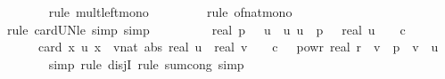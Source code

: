\begin{isabellebody}
\ \ \ \ \ \ \isamarkupfalse%
\ {\isacharparenleft}{\kern0pt}rule\ mult{\isacharunderscore}{\kern0pt}left{\isacharunderscore}{\kern0pt}mono{\isacharparenright}{\kern0pt}\isanewline
\ \ \ \ \ \ \ \isamarkupfalse%
\ {\isacharparenleft}{\kern0pt}rule\ of{\isacharunderscore}{\kern0pt}nat{\isacharunderscore}{\kern0pt}mono{\isacharparenright}{\kern0pt}\isanewline
\ \ \ \ \ \ \isamarkupfalse%
\ {\isacharparenleft}{\kern0pt}rule\ card{\isacharunderscore}{\kern0pt}UN{\isacharunderscore}{\kern0pt}le{\isacharcomma}{\kern0pt}\ simp{\isacharcomma}{\kern0pt}\ simp{\isacharparenright}{\kern0pt}\isanewline
\ \ \ \ \isamarkupfalse%
\ \isamarkupfalse%
\ {\isachardoublequoteopen}{\isachardot}{\kern0pt}{\isachardot}{\kern0pt}{\isachardot}{\kern0pt}\ {\isacharequal}{\kern0pt}\ {}{\isacharslash}{\kern0pt}{\isacharparenleft}{\kern0pt}real\ p{\isacharparenright}{\kern0pt}\ {\isacharasterisk}{\kern0pt}\ {\isacharparenleft}{\kern0pt}{\isasymSum}\ u{\isacharprime}{\kern0pt}\ {\isasymin}\ {\isacharbraceleft}{\kern0pt}u{\isachardot}{\kern0pt}\ u\ {\isacharless}{\kern0pt}\ p\ {\isasymand}\ \ real\ u\ {\isasymle}\ {}\ {\isacharasterisk}{\kern0pt}\ c{\isacharbraceright}{\kern0pt}{\isachardot}{\kern0pt}\isanewline
\ \ \ \ \ \ card\ {\isacharparenleft}{\kern0pt}{\isacharparenleft}{\kern0pt}{\isasymlambda}x{\isachardot}{\kern0pt}\ {\isacharparenleft}{\kern0pt}u{\isacharprime}{\kern0pt}\ {\isacharcomma}{\kern0pt}x{\isacharparenright}{\kern0pt}{\isacharparenright}{\kern0pt}\ {\isacharbackquote}{\kern0pt}\ {\isacharbraceleft}{\kern0pt}{\isacharparenleft}{\kern0pt}v{\isacharcolon}{\kern0pt}{\isacharcolon}{\kern0pt}nat{\isacharparenright}{\kern0pt}{\isachardot}{\kern0pt}\ abs\ {\isacharparenleft}{\kern0pt}real\ u{\isacharprime}{\kern0pt}\ {\isacharminus}{\kern0pt}\ real\ v{\isacharparenright}{\kern0pt}\ {\isasymle}\ {}\ {\isacharasterisk}{\kern0pt}\ c\ {\isacharasterisk}{\kern0pt}\ {}\ powr\ {\isacharparenleft}{\kern0pt}{\isacharminus}{\kern0pt}real\ r{\isacharparenright}{\kern0pt}\ {\isasymand}\ v\ {\isacharless}{\kern0pt}\ p\ {\isasymand}\ v\ {\isasymnoteq}\ u{\isacharprime}{\kern0pt}{\isacharbraceright}{\kern0pt}{\isacharparenright}{\kern0pt}{\isacharparenright}{\kern0pt}{\isachardoublequoteclose}\isanewline
\ \ \ \ \ \ \isamarkupfalse%
\ {\isacharparenleft}{\kern0pt}simp{\isacharcomma}{\kern0pt}\ rule\ disjI{}{\isacharcomma}{\kern0pt}\ rule\ sum{\isachardot}{\kern0pt}cong{\isacharcomma}{\kern0pt}\ simp{\isacharparenright}{\kern0pt}\isanewline

\end{isabellebody}
